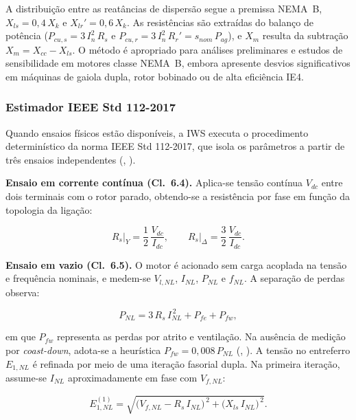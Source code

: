 \documentclass[a4paper]{ifacconf}
\begin{document}
A distribuição entre as reatâncias de dispersão segue a premissa NEMA~B, $X_{ls} = 0{,}4\,X_k$ e $X_{lr}' = 0{,}6\,X_k$. As resistências são extraídas do balanço de potência ($P_{cu,s} = 3\,I_n^2\,R_s$ e $P_{cu,r} = 3\,I_n^2\,R_r' = s_{nom}\,P_{ag}$), e $X_m$ resulta da subtração $X_m = X_{cc} - X_{ls}$. O método é apropriado para análises preliminares e estudos de sensibilidade em motores classe NEMA~B, embora apresente desvios significativos em máquinas de gaiola dupla, rotor bobinado ou de alta eficiência IE4.

\subsubsection{Estimador IEEE Std 112-2017}

Quando ensaios físicos estão disponíveis, a IWS executa o procedimento determinístico da norma IEEE Std 112-2017, que isola os parâmetros a partir de três ensaios independentes (\citeauthor{ieee112_2017}, \citeyear{ieee112_2017}).

\textbf{Ensaio em corrente contínua (Cl.~6.4).} Aplica-se tensão contínua $V_{dc}$ entre dois terminais com o rotor parado, obtendo-se a resistência por fase em função da topologia da ligação:

\begin{equation}
\label{eq:ieee_rs}
R_s\big|_Y = \frac{1}{2}\,\frac{V_{dc}}{I_{dc}}, \qquad R_s\big|_\Delta = \frac{3}{2}\,\frac{V_{dc}}{I_{dc}}.
\end{equation}

\textbf{Ensaio em vazio (Cl.~6.5).} O motor é acionado sem carga acoplada na tensão e frequência nominais, e medem-se $V_{l,NL}$, $I_{NL}$, $P_{NL}$ e $f_{NL}$. A separação de perdas observa:

\begin{equation}
\label{eq:ieee_pnl}
P_{NL} = 3\,R_s\,I_{NL}^{\,2} + P_{fe} + P_{fw},
\end{equation}

\noindent em que $P_{fw}$ representa as perdas por atrito e ventilação. Na ausência de medição por \textit{coast-down}, adota-se a heurística $P_{fw} = 0{,}008\,P_{NL}$ (\citeauthor{ieee112_2017}, \citeyear{ieee112_2017}). A tensão no entreferro $E_{1,NL}$ é refinada por meio de uma iteração fasorial dupla. Na primeira iteração, assume-se $I_{NL}$ aproximadamente em fase com $V_{f,NL}$:

\begin{equation}
\label{eq:ieee_e1_iter1}
E_{1,NL}^{(1)} = \sqrt{\bigl(V_{f,NL} - R_s\,I_{NL}\bigr)^{\,2} + \bigl(X_{ls}\,I_{NL}\bigr)^{\,2}}.
\end{equation}
\end{document}
